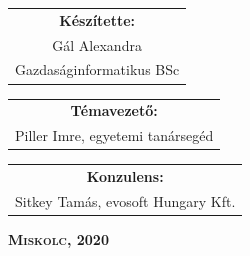 \vspace*{2.5truecm}
{\large
\begin{center}
\begin{tabular}{c}
\textbf{Készítette:}\\
Gál Alexandra\\
Gazdaságinformatikus BSc
\end{tabular}
\end{center}
\begin{center}
\begin{tabular}{c}
\textbf{Témavezető:}\\
Piller Imre, egyetemi tanársegéd
\end{tabular}
\end{center}
\begin{center}
\begin{tabular}{c}
\textbf{Konzulens:}\\
Sitkey Tamás, evosoft Hungary Kft.
\end{tabular}
\end{center}}
\vfill
{\large
\begin{center}
\textbf{\textsc{Miskolc, 2020}}
\end{center}}

\newpage
